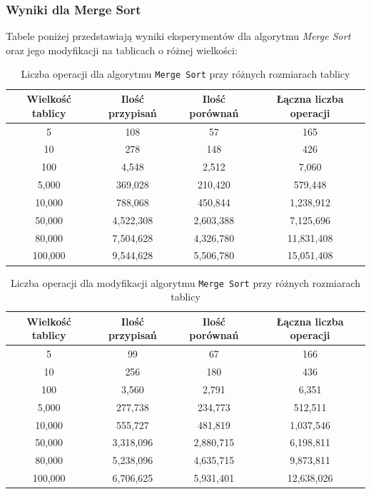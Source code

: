 \documentclass{article}
\begin{document}
\subsubsection{Wyniki dla Merge Sort}
Tabele poniżej przedstawiają wyniki eksperymentów dla algorytmu \textit{Merge Sort} oraz jego modyfikacji na tablicach o różnej wielkości:
\begin{table}[H]
    \centering
    \begin{tabular}{|c|c|c|c|}
    \hline
    \textbf{Wielkość tablicy} & \textbf{Ilość przypisań} & \textbf{Ilość porównań} & \textbf{Łączna liczba operacji} \\ \hline
    5 & 108 & 57 & 165 \\ \hline
    10 & 278 & 148 & 426 \\ \hline
    100 & 4,548 & 2,512 & 7,060 \\ \hline
    5,000 & 369,028 & 210,420 & 579,448 \\ \hline
    10,000 & 788,068 & 450,844 & 1,238,912 \\ \hline
    50,000 & 4,522,308 & 2,603,388 & 7,125,696 \\ \hline
    80,000 & 7,504,628 & 4,326,780 & 11,831,408 \\ \hline
    100,000 & 9,544,628 & 5,506,780 & 15,051,408 \\ \hline
    \end{tabular}
    \caption{Liczba operacji dla algorytmu \texttt{Merge Sort} przy różnych rozmiarach tablicy}
    \label{tab:merge_results}
\end{table}

\begin{table}[H]
    \centering
    \begin{tabular}{|c|c|c|c|}
    \hline
    \textbf{Wielkość tablicy} & \textbf{Ilość przypisań} & \textbf{Ilość porównań} & \textbf{Łączna liczba operacji} \\ \hline
    5 & 99 & 67 & 166 \\ \hline
    10 & 256 & 180 & 436 \\ \hline
    100 & 3,560 & 2,791 & 6,351 \\ \hline
    5,000 & 277,738 & 234,773 & 512,511 \\ \hline
    10,000 & 555,727 & 481,819 & 1,037,546 \\ \hline
    50,000 & 3,318,096 & 2,880,715 & 6,198,811 \\ \hline
    80,000 & 5,238,096 & 4,635,715 & 9,873,811 \\ \hline
    100,000 & 6,706,625 & 5,931,401 & 12,638,026 \\ \hline
    \end{tabular}
    \caption{Liczba operacji dla modyfikacji algorytmu \texttt{Merge Sort} przy różnych rozmiarach tablicy}
    \label{tab:m_merge_results}
\end{table}
\end{document}
